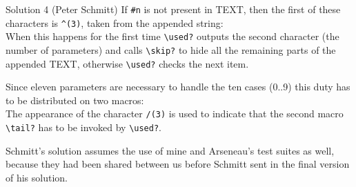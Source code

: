 \begin{solution}{Solution 4 (Peter Schmitt)}
   If \verb?#n? is not present in TEXT, then the first of these characters is
\verb?^(3)?, taken from the appended string: \\
When this happens for the first time \verb|\used?| outputs the second character
(the number of parameters) and calls \verb|\skip?| to hide all the remaining
parts of the appended TEXT, otherwise \verb|\used?| checks the next item.

   Since eleven parameters are necessary to handle the ten cases (0..9) this
duty has to be distributed on two macros: \\
The appearance of the character \verb?/(3)? is used to indicate that the second
   macro \verb|\tail?| has to be invoked by \verb|\used?|.
\end{solution}

Schmitt's solution assumes the use of mine and Arseneau's test suites
as well, because they had been shared between us before Schmitt sent
in the final version of his solution.

\begin{comment}
Answers for Exercise 7 will follow next week.

Michael Downes                             mjd@math.ams.com (Internet)
\end{comment}


